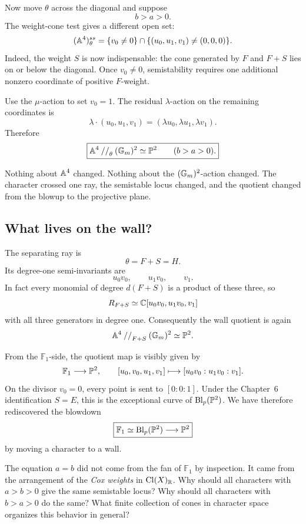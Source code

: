 Now move \(\theta\) across the diagonal and suppose
\[
b>a>0.
\]
The weight-cone test gives a different open set:
\[
(\mathbb{A}^4)^{ss}_\theta
=
\{v_0\neq0\}
\cap
\{(u_0,u_1,v_1)\neq(0,0,0)\}.
\]
Indeed, the weight \(S\) is now indispensable: the cone generated by
\(F\) and \(F+S\) lies on or below the diagonal.  Once \(v_0\neq0\),
semistability requires one additional nonzero coordinate of positive
\(F\)-weight.

Use the \(\mu\)-action to set \(v_0=1\).  The residual \(\lambda\)-action
on the remaining coordinates is
\[
\lambda\cdot(u_0,u_1,v_1)
=(\lambda u_0,\lambda u_1,\lambda v_1).
\]
Therefore
\[
\boxed{
\mathbb{A}^4\mathbin{//}_\theta(\mathbb{G}_{m})^2\simeq\mathbb{P}^2
\qquad(b>a>0).}
\]

Nothing about \(\mathbb{A}^4\) changed.  Nothing about the
\((\mathbb{G}_{m})^2\)-action changed.  The character crossed one ray, the
semistable locus changed, and the quotient changed from the blowup to
the projective plane.

\subsection{What lives on the wall?}

The separating ray is
\[
\theta=F+S=H.
\]
Its degree-one semi-invariants are
\[
u_0v_0,
\qquad
u_1v_0,
\qquad
v_1.
\]
In fact every monomial of degree \(d(F+S)\) is a product of these
three, so
\[
R_{F+S}
\simeq
\mathbb{C}[u_0v_0,u_1v_0,v_1]
\]
with all three generators in degree one.  Consequently the wall
quotient is again
\[
\mathbb{A}^4\mathbin{//}_{F+S}(\mathbb{G}_{m})^2\simeq\mathbb{P}^2.
\]

From the \(\mathbb F_1\)-side, the quotient map is visibly given by
\[
\mathbb F_1\longrightarrow\mathbb{P}^2,
\qquad
[u_0,v_0,u_1,v_1]
\longmapsto
[u_0v_0:u_1v_0:v_1].
\]
On the divisor \(v_0=0\), every point is sent to
\([0:0:1]\).  Under the Chapter~6 identification \(S=E\), this is the
exceptional curve of \(\operatorname{Bl}_p(\mathbb{P}^2)\).  We have therefore rediscovered
the blowdown
\[
\boxed{
\mathbb F_1\simeq\operatorname{Bl}_p(\mathbb{P}^2)
\longrightarrow
\mathbb{P}^2}
\]
by moving a character to a wall.

\begin{pauseandthink}
The equation \(a=b\) did not come from the fan of \(\mathbb F_1\) by
inspection.  It came from the arrangement of the \emph{Cox weights} in
\(\operatorname{Cl}(X)_{\mathbb{R}}\).  Why should all characters with \(a>b>0\) give the same
semistable locus?  Why should all characters with \(b>a>0\) do the
same?  What finite collection of cones in character space organizes
this behavior in general?
\end{pauseandthink}


